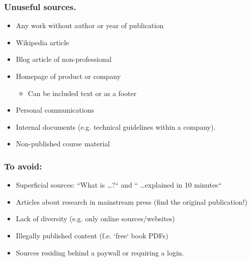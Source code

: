 \documentclass[aspectratio=169]{beamer}
\begin{document}
\begin{frame}
    \frametitle{Unuseful sources.}

    \begin{itemize}
        \item Any work without author or year of publication
        \item Wikipedia article
        \item Blog article of non-professional
        \item Homepage of product or company
              \begin{itemize}
                  \item Can be included text or as a footer
              \end{itemize}
        \item Personal communications
        \item Internal documents (e.g. technical guidelines within a company).
        \item Non-published course material
    \end{itemize}
    \bigskip
\end{frame}

\begin{frame}
	\frametitle{To avoid:}
	
	\begin{itemize}
		\item Superficial sources: ``What is {\ldots}{?}`` and `` \ldots explained in 10 minutes``
		\item Articles about research in mainstream press (find the original publication!)
		\item Lack of diversity (e.g. only online sources/websites)
		\item Illegally published content (f.e. `free` book PDFs) 
		\item Sources residing behind a paywall or requiring a login.
	\end{itemize}
\end{frame}
\end{document}
